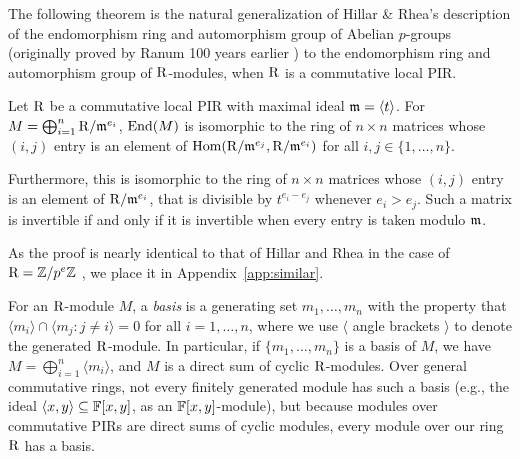 The following theorem is the natural generalization of Hillar \& Rhea's description of the endomorphism ring and automorphism group of Abelian $p$-groups \cite{HillarRhea} (originally proved by Ranum 100 years earlier \cite{Ranum}) to the endomorphism ring and automorphism group of $\mathrm{R}$-modules, when $\mathrm{R}$ is a commutative local PIR. 

\begin{theorem} \label{thm:HillarRheaPIR}
	Let $\mathrm{R}$ be a commutative local PIR with maximal ideal $\mathfrak{m} = \langle t \rangle$. For $M = \bigoplus_{i=1}^n \mathrm{R}/\mathfrak{m}^{e_i}$, $\mathrm{End}(M)$ is isomorphic to the ring of $n \times n$ matrices whose $(i,j)$ entry is an element of $\mathrm{Hom}(\mathrm{R}/\mathfrak{m}^{e_j}, \mathrm{R}/\mathfrak{m}^{e_i})$ for all $i,j \in \{1,\dotsc,n\}$. 
	
	Furthermore, this is isomorphic to the ring of $n \times n$ matrices whose $(i,j)$ entry is an element of $\mathrm{R}/\mathfrak{m}^{e_i}$, that is divisible by $t^{e_i - e_j}$ whenever $e_i > e_j$. Such a matrix is invertible if and only if it is invertible when every entry is taken modulo $\mathfrak{m}$.
\end{theorem}

As the proof is nearly identical to that of Hillar and Rhea in the case of $\mathrm{R} = \mathbb{Z}/p^e \mathbb{Z}$ \cite{HillarRhea}, we place it in Appendix~\ref{app:similar}.

For an $\mathrm{R}$-module $M$, a \emph{basis} is a generating set $m_1, \dotsc, m_n$ with the property that $\langle m_i \rangle \cap \langle m_j : j \neq i \rangle = 0$ for all $i=1,\dotsc,n$, where we use $\langle$ angle brackets $\rangle$ to denote the generated $\mathrm{R}$-module. In particular, if $\{m_1,\dotsc,m_n\}$ is a basis of $M$, we have $M = \bigoplus_{i=1}^n \langle m_i \rangle$, and $M$ is a direct sum of cyclic $\mathrm{R}$-modules. Over general commutative rings, not every finitely generated module has such a basis (e.g., the ideal $\langle x, y\rangle \subseteq \mathbb{F}[x,y]$, as an $\mathbb{F}[x,y]$-module), but because modules over commutative PIRs are direct sums of cyclic modules, every module over our ring $\mathrm{R}$ has a basis. %
